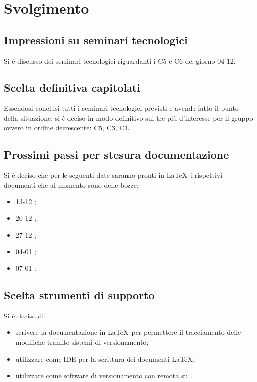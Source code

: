 \documentclass[]{article}
\begin{document}
	\newpage

	\section{Svolgimento}
		\subsection{Impressioni su seminari tecnologici}
		Si è discusso dei seminari tecnologici riguardanti i  C5 e C6 del giorno 04-12.\\

		\subsection{Scelta definitiva capitolati}
		Essendosi conclusi tutti i seminari tecnologici previsti e avendo fatto il punto della situazione, si è deciso in modo definitivo sui tre  più d'interesse per il gruppo ovvero in ordine decrescente: C5, C3, C1.\\

		\subsection{Prossimi passi per stesura documentazione}
		Si è deciso che per le seguenti date saranno pronti in \LaTeX\ i rispettivi documenti che al momento sono delle bozze:
		\begin{itemize}
			\item 13-12 ;
			\item 20-12 ;
			\item 27-12 ;
			\item 04-01 ;
			\item 07-01 .\\
		\end{itemize}

		\subsection{Scelta strumenti di supporto}
		Si è deciso di:
		\begin{itemize}
			\item scrivere la documentazione in \LaTeX\ per permettere il tracciamento delle modifiche tramite sistemi di versionamento;
			\item utilizzare  come IDE per la scrittura dei documenti \LaTeX;
			\item utilizzare  come software di versionamento con  remota su .
		\end{itemize}
\end{document}
